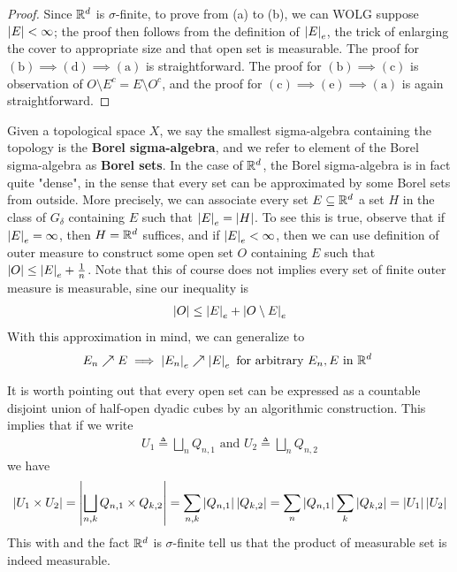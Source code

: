 \documentclass{report}
\begin{document}
\begin{proof}
Since $\mathbb{R}^d$ is  $\sigma$-finite, to prove from (a) to (b), we can WOLG suppose $\left|E\right|<\infty$; the proof then follows from the definition of $\left|E\right|_e$, the trick of enlarging the cover to appropriate size and that open set is measurable. The proof for $(\text{b})\implies (\text{d})\implies (\text{a})$ is straightforward. The proof for $(\text{b})\implies (\text{c})$ is observation of $O \setminus E^c= E\setminus O^c$, and the proof for  $(\text{c})\implies (\text{e})\implies (\text{a})$ is again straightforward.
\end{proof}
\begin{mdframed}
  Given a topological space $X$, we say the smallest sigma-algebra containing the topology is the  \textbf{Borel sigma-algebra}, and we refer to element of the Borel sigma-algebra as \textbf{Borel sets}. In the case of $\mathbb{R}^d$, the Borel sigma-algebra is in fact quite "dense", in the sense that every set can be approximated by some Borel sets from outside. More precisely, we can associate every set $E\subseteq \mathbb{R}^d$ a set $H$ in the class of  $G_\delta$ containing $E$ such that $\left|E\right|_e=\left|H\right|$. To see this is true, observe that if $\left|E\right|_e=\infty$, then $H=\mathbb{R}^d$ suffices, and if  $\left|E\right|_e<\infty$, then we can use definition of outer measure to construct some open set $O$ containing $E$ such that $\left|O\right|\leq \left|E\right|_e + \frac{1}{n} $.  Note that this of course does not implies every set of finite outer measure is measurable, sine our inequality is 
  \begin{align*}
  \left|O\right|\leq \left|E\right|_e + \left|O\setminus E\right|_e
  \end{align*}
  With this approximation in mind, we can generalize  to 
\begin{align*}
E_n \nearrow E \implies \left|E_n\right|_e\nearrow \left|E\right|_e\text{ for arbitrary $E_n,E$ in $\mathbb{R}^d$ }
\end{align*}
\label{dyadic cube}

It is worth pointing out that every open set can be expressed as a countable disjoint union of half-open dyadic cubes by an algorithmic construction. This implies that if we write  
\begin{align*}
U_1\triangleq \bigsqcup_n Q_{n,1}\text{ and }U_2 \triangleq \bigsqcup_n Q_{n,2}
\end{align*}
we have 
\begin{align*}
\left|U_1\times U_2\right|=\left|\bigsqcup_{n,k}Q_{n,1}\times Q_{k,2}\right|=\sum_{n,k} \left|Q_{n,1}\right| \left|Q_{k,2}\right|= \sum_n \left|Q_{n,1}\right|\sum_{k} \left|Q_{k,2}\right|= \left|U_1\right|\left|U_2\right|
\end{align*}
This with   and the fact $\mathbb{R}^d$ is  $\sigma$-finite tell us that the product of measurable set is indeed measurable. \\


\end{mdframed}
\end{document}
